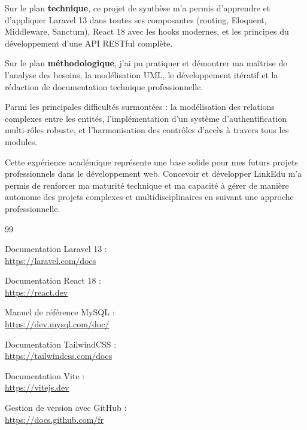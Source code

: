 \documentclass[12pt,a4paper]{report}
\begin{document}
    Sur le plan \textbf{technique}, ce projet de synthèse m'a permis d'apprendre et d'appliquer Laravel 13 dans toutes ses composantes (routing, Eloquent, Middleware, Sanctum), React 18 avec les hooks modernes, et les principes du développement d'une API RESTful complète.

    Sur le plan \textbf{méthodologique}, j'ai pu pratiquer et démontrer ma maîtrise de l'analyse des besoins, la modélisation UML, le développement itératif et la rédaction de documentation technique professionnelle.

    Parmi les principales difficultés surmontées : la modélisation des relations complexes entre les entités, l'implémentation d'un système d'authentification multi-rôles robuste, et l'harmonisation des contrôles d'accès à travers tous les modules.

    Cette expérience académique représente une base solide pour mes futurs projets professionnels dans le développement web. Concevoir et développer LinkEdu m'a permis de renforcer ma maturité technique et ma capacité à gérer de manière autonome des projets complexes et multidisciplinaires en suivant une approche professionnelle.

    \newpage
    \begin{thebibliography}{99}

    Documentation Laravel 13 : \\
    \url{https://laravel.com/docs}

    Documentation React 18 : \\
    \url{https://react.dev}

    Manuel de référence MySQL : \\
    \url{https://dev.mysql.com/doc/}

    Documentation TailwindCSS : \\
    \url{https://tailwindcss.com/docs}

    Documentation Vite : \\
    \url{https://vitejs.dev}

    Gestion de version avec GitHub : \\
    \url{https://docs.github.com/fr}

    \end{thebibliography}

    
\end{document}
